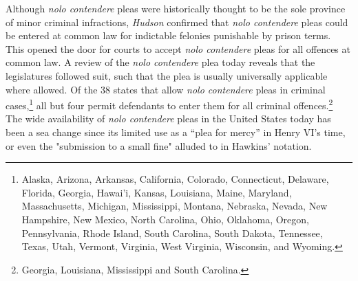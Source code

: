 

Although \textit{nolo contendere} pleas were historically thought to be the sole province of minor criminal infractions, \textit{Hudson} confirmed that \textit{nolo contendere} pleas could be entered at common law for indictable felonies punishable by prison terms. This opened the door for courts to accept \textit{nolo contendere} pleas for all offences at common law. A review of the \textit{nolo contendere} plea today reveals that the legislatures followed suit, such that the plea is usually universally applicable where allowed. Of the 38 states that allow \textit{nolo contendere} pleas in criminal cases,\footnote{Alaska, Arizona, Arkansas, California, Colorado, Connecticut, Delaware, Florida, Georgia, Hawai'i, Kansas, Louisiana, Maine, Maryland, Massachusetts, Michigan, Mississippi, Montana, Nebraska, Nevada, New Hampshire, New Mexico, North Carolina, Ohio, Oklahoma, Oregon, Pennsylvania, Rhode Island, South Carolina, South Dakota, Tennessee, Texas, Utah, Vermont, Virginia, West Virginia, Wisconsin, and Wyoming.} all but four permit defendants to enter them for all criminal offences.\footnote{Georgia, Louisiana, Mississippi and South Carolina.} The wide availability of \textit{nolo contendere} pleas in the United States today has been a sea change since its limited use as a ``plea for mercy'' in Henry VI's time, or even the "submission to a small fine" alluded to in Hawkins' notation. 


